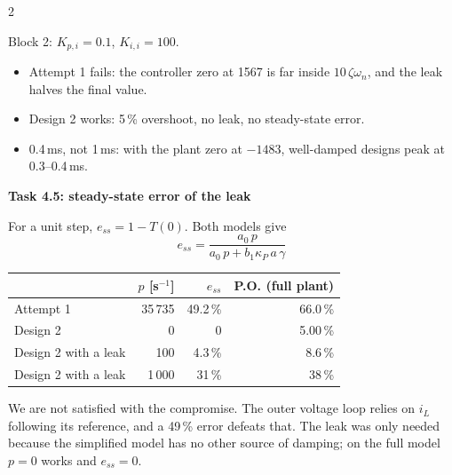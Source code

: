 \documentclass[8pt]{extarticle}
\newcounter{psec}
\newcommand{\psection}[1]{%
  \refstepcounter{psec}\vspace{5pt}%
  \colorbox{ntnu}{\parbox{\dimexpr\linewidth-2\fboxsep}{%
    \color{white}\sffamily\bfseries\large\thepsec\quad #1}}\par\vspace{2pt}}
\newcommand{\zwn}{\zeta\omega_n}
\begin{document}
\begin{multicols}{2}
\begin{minipage}[c]{0.48\linewidth}
\smallskip
Block 2: $K_{p,i}=0.1$, $K_{i,i}=100$.
\end{minipage}

\begin{itemize}
\item Attempt 1 fails: the controller zero at 1567 is far inside
  $10\,\zwn$, and the leak halves the final value.
\item Design 2 works: 5\,\% overshoot, no leak, no steady-state error.
\item 0.4\,ms, not 1\,ms: with the plant zero at $-1483$, well-damped
  designs peak at 0.3--0.4\,ms.
\end{itemize}

\psection{Task 4.5: steady-state error of the leak}

For a unit step, $e_{ss}=1-T(0)$. Both models give
\[
e_{ss}=\frac{a_0\,p}{a_0\,p+b_1\kappa_P\,a\,\gamma}
\]
\begin{center}\small
\begin{tabular}{@{}lrrr@{}}
\toprule
 & $p$ [s$^{-1}$] & $e_{ss}$ & P.O. (full plant)\\
\midrule
Attempt 1 & 35\,735 & 49.2\,\% & 66.0\,\%\\
Design 2 & 0 & 0 & 5.00\,\%\\
Design 2 with a leak & 100 & 4.3\,\% & 8.6\,\%\\
Design 2 with a leak & 1\,000 & 31\,\% & 38\,\%\\
\bottomrule
\end{tabular}
\end{center}
We are not satisfied with the compromise. The outer voltage loop relies on
$i_L$ following its reference, and a 49\,\% error defeats that. The leak was
only needed because the simplified model has no other source of damping; on
the full model $p=0$ works and $e_{ss}=0$.

\end{multicols}
\end{document}
